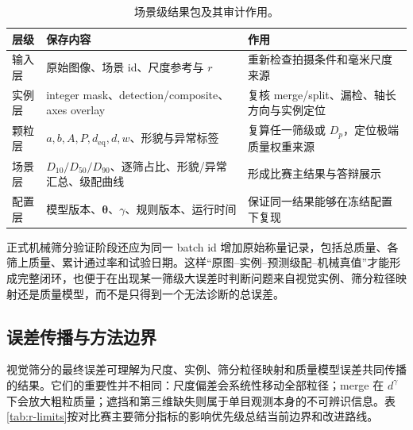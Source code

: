 \begin{table}[t]
\centering
\caption{场景级结果包及其审计作用。}
\label{tab:r-output-chain}
\footnotesize
\renewcommand{\arraystretch}{1.12}
\begin{tabular}{>{\raggedright\arraybackslash}p{2.7cm}>{\raggedright\arraybackslash}p{5.0cm}>{\raggedright\arraybackslash}p{5.4cm}}
\toprule
层级 & 保存内容 & 作用 \\
\midrule
输入层 & 原始图像、场景 id、尺度参考与 $r$ & 重新检查拍摄条件和毫米尺度来源 \\
实例层 & integer mask、detection/composite、axes overlay & 复核 merge/split、漏检、轴长方向与实例定位 \\
颗粒层 & $a,b,A,P,d_{\mathrm{eq}},d,w$、形貌与异常标签 & 复算任一筛级或 $D_p$，定位极端质量权重来源 \\
场景层 & $D_{10}/D_{50}/D_{90}$、逐筛占比、形貌/异常汇总、级配曲线 & 形成比赛主结果与答辩展示 \\
配置层 & 模型版本、$\boldsymbol{\theta}$、$\gamma$、规则版本、运行时间 & 保证同一结果能够在冻结配置下复现 \\
\bottomrule
\end{tabular}
\end{table}

正式机械筛分验证阶段还应为同一 batch id 增加原始称量记录，包括总质量、各筛上质量、累计通过率和试验日期。这样“原图--实例--预测级配--机械真值”才能形成完整闭环，也便于在出现某一筛级大误差时判断问题来自视觉实例、筛分粒径映射还是质量模型，而不是只得到一个无法诊断的总误差。

\subsection{误差传播与方法边界}

视觉筛分的最终误差可理解为尺度、实例、筛分粒径映射和质量模型误差共同传播的结果。它们的重要性并不相同：尺度偏差会系统性移动全部粒径；merge 在 $d^{\gamma}$ 下会放大粗粒质量；遮挡和第三维缺失则属于单目观测本身的不可辨识信息。表\ref{tab:r-limits}按对比赛主要筛分指标的影响优先级总结当前边界和改进路线。

